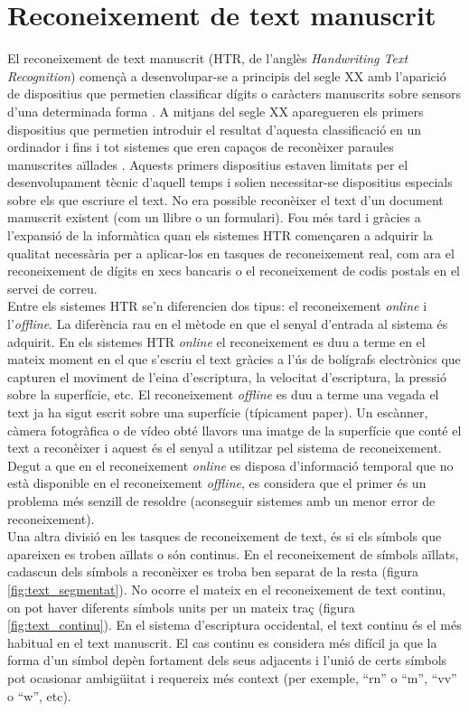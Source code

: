 \section{Reconeixement de text manuscrit}
El reconeixement de text manuscrit (HTR, de l'anglès \emph{Handwriting Text Recognition}) començà a desenvolupar-se a principis del segle XX amb l'aparició de dispositius que permetien classificar dígits o caràcters manuscrits sobre sensors d'una determinada forma \cite{Goldberg1914}. A mitjans del segle XX aparegueren els primers dispositius que permetien introduir el resultat d'aquesta classificació en un ordinador \cite{10.1109/AFIPS.1957.60} i fins i tot sistemes que eren capaços de reconèixer paraules manuscrites aïllades \cite{Harmon1962}. Aquests primers dispositius estaven limitats per el desenvolupament tècnic d'aquell temps i solien necessitar-se dispositius especials sobre els que escriure el text. No era possible reconèixer el text d'un document manuscrit existent (com un llibre o un formulari). Fou més tard i gràcies a l'expansió de la informàtica quan els sistemes HTR començaren a adquirir la qualitat necessària per a aplicar-los en tasques de reconeixement real, com ara el reconeixement de dígits en xecs bancaris o el reconeixement de codis postals en el servei de correu.\\

Entre els sistemes HTR se'n diferencien dos tipus: el reconeixement \emph{online} i l'\emph{offline}. La diferència rau en el mètode en que el senyal d'entrada al sistema és adquirit. En els sistemes HTR \emph{online} el reconeixement es duu a terme en el mateix moment en el que s'escriu el text gràcies a l'ús de bolígrafs electrònics que capturen el moviment de l'eina d'escriptura, la velocitat d'escriptura, la pressió sobre la superfície, etc. El reconeixement \emph{offline} es duu a terme una vegada el text ja ha sigut escrit sobre una superfície (típicament paper). Un escànner, càmera fotogràfica o de vídeo obté llavors una imatge de la superfície que conté el text a reconèixer i aquest és el senyal a utilitzar pel sistema de reconeixement. Degut a que en el reconeixement \emph{online} es disposa d'informació temporal que no està disponible en el reconeixement \emph{offline}, es considera que el primer és un problema més senzill de resoldre (aconseguir sistemes amb un menor error de reconeixement).\\

Una altra divisió en les tasques de reconeixement de text, és si els símbols que apareixen es troben aïllats o són continus. En el reconeixement de símbols aïllats, cadascun dels símbols a reconèixer es troba ben separat de la resta (figura \ref{fig:text_segmentat}). No ocorre el mateix en el reconeixement de text continu, on pot haver diferents símbols units per un mateix traç (figura \ref{fig:text_continu}). En el sistema d'escriptura occidental, el text continu és el més habitual en el text manuscrit. El cas continu es considera més difícil ja que la forma d'un símbol depèn fortament dels seus adjacents i l'unió de certs símbols pot ocasionar ambigüitat i requereix més context (per exemple, ``rn'' o ``m'', ``vv'' o ``w'', etc).\\

